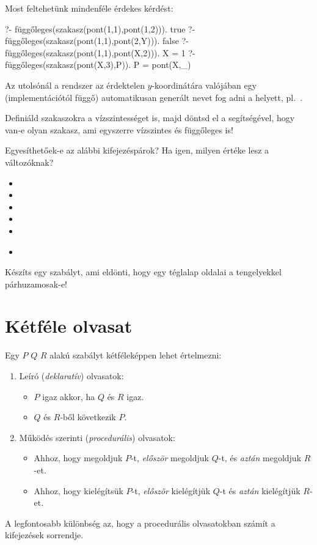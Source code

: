 Most feltehetünk mindenféle érdekes kérdést:
\begin{query}
?- függőleges(szakasz(pont(1,1),pont(1,2))).
true
?- függőleges(szakasz(pont(1,1),pont(2,Y))).
false
?- függőleges(szakasz(pont(1,1),pont(X,2))).
X = 1
?- függőleges(szakasz(pont(X,3),P)).
P = pont(X,_)
\end{query}
Az utolsónál a rendszer az érdektelen
$y$-koordinátára valójában egy (implementációtól
függő) automatikusan generált nevet fog adni a
\pr{\_} helyett, pl.~.

\begin{problem}
Definiáld szakaszokra a vízszintességet is, majd
döntsd el a segítségével, hogy van-e olyan szakasz,
ami egyszerre vízszintes és függőleges is!
\end{problem}
\begin{problem}
Egyesíthetőek-e az alábbi kifejezéspárok? Ha igen,
milyen értéke lesz a változóknak?
\begin{itemize}
\item {}
\item {}
\item {}
\item {}
\item {}
\item {}\\
\end{itemize}
\end{problem}
\begin{problem}
Készíts egy szabályt, ami eldönti, hogy egy téglalap
oldalai a tengelyekkel párhuzamosak-e!
\end{problem}

\section{Kétféle olvasat}
Egy $P$ \pr{:-} $Q$\pr{,} $R$ alakú szabályt
kétféleképpen lehet értelmezni:
\begin{enumerate}
\item Leíró (\emph{deklaratív}) olvasatok:
  \begin{itemize}
    \item $P$ igaz akkor, ha $Q$ és $R$ igaz.
    \item $Q$ és $R$-ből következik $P$.
  \end{itemize}
\item Működés szerinti (\emph{procedurális}) olvasatok:
  \begin{itemize}
    \item Ahhoz, hogy megoldjuk $P$-t,
      \emph{először} megoldjuk $Q$-t, és
      \emph{aztán} megoldjuk $R$-et.
    \item Ahhoz, hogy kielégítsük $P$-t,
      \emph{először} kielégítjük $Q$-t és
      \emph{aztán} kielégítjük $R$-et.
  \end{itemize}
\end{enumerate}
A legfontosabb különbség az, hogy a procedurális
olvasatokban számít a kifejezések sorrendje.

